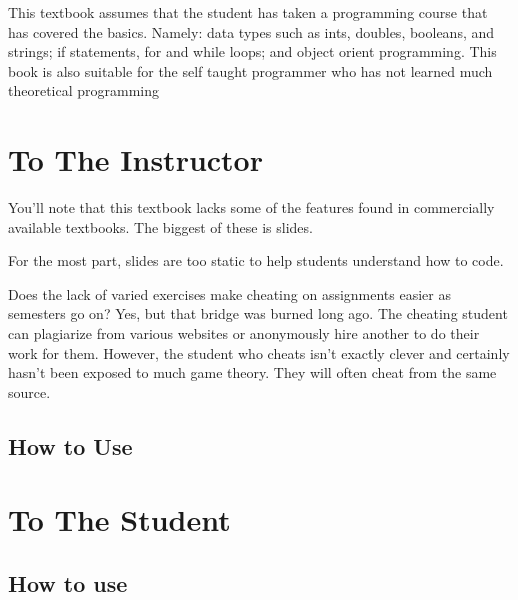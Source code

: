 This textbook assumes that the student has taken a programming course that has covered the basics.
Namely: data types such as ints, doubles, booleans, and strings; if statements, for and while loops; and object orient programming.
This book is also suitable for the self taught programmer who has not learned much theoretical programming

\section{To The Instructor}

You'll note that this textbook lacks some of the features found in commercially available textbooks.  The biggest of these is slides.  



For the most part, slides are too static to help students understand how to code.



Does the lack of varied exercises make cheating on assignments easier as semesters go on?  Yes, but that bridge was burned long ago.  
The cheating student can plagiarize from various websites or anonymously hire another to do their work for them.
However, the student who cheats isn't exactly clever and certainly hasn't been exposed to much game theory.  
They will often cheat from the same source.  

\subsection{How to Use}

\section{To The Student}


\subsection{How to use}



